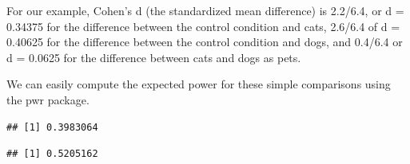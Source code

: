 \documentclass[]{article}
\newenvironment{Shaded}{\begin{snugshade}}{\end{snugshade}}
\newcommand{\KeywordTok}[1]{\textcolor[rgb]{0.13,0.29,0.53}{\textbf{#1}}}
\newcommand{\DataTypeTok}[1]{\textcolor[rgb]{0.13,0.29,0.53}{#1}}
\newcommand{\DecValTok}[1]{\textcolor[rgb]{0.00,0.00,0.81}{#1}}
\newcommand{\FloatTok}[1]{\textcolor[rgb]{0.00,0.00,0.81}{#1}}
\newcommand{\StringTok}[1]{\textcolor[rgb]{0.31,0.60,0.02}{#1}}
\newcommand{\OperatorTok}[1]{\textcolor[rgb]{0.81,0.36,0.00}{\textbf{#1}}}
\newcommand{\NormalTok}[1]{#1}
\begin{document}
For our example, Cohen's d (the standardized mean difference) is
2.2/6.4, or d = 0.34375 for the difference between the control condition
and cats, 2.6/6.4 of d = 0.40625 for the difference between the control
condition and dogs, and 0.4/6.4 or d = 0.0625 for the difference between
cats and dogs as pets.

We can easily compute the expected power for these simple comparisons
using the pwr package.

\begin{Shaded}
\end{Shaded}

\begin{verbatim}
## [1] 0.3983064
\end{verbatim}

\begin{Shaded}
\end{Shaded}

\begin{verbatim}
## [1] 0.5205162
\end{verbatim}

\begin{Shaded}
\end{Shaded}
\end{document}
